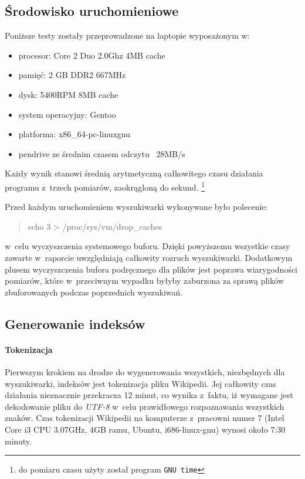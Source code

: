 \documentclass[a4paper,12pt]{article}
\begin{document}
\subsection{Środowisko uruchomieniowe}

Poniższe testy zostały przeprowadzone na laptopie wyposażonym w:
\begin{itemize}
	\item procesor: Core 2 Duo 2.0Ghz 4MB cache
	\item pamięć: 2 GB DDR2 667MHz
	\item dysk: 5400RPM 8MB cache
	\item system operacyjny: Gentoo
	\item platforma: x86\_64-pc-linux\dywiz gnu
	\item pendrive ze średnim czasem odczytu ~28MB/s
\end{itemize}
Każdy wynik stanowi średnią arytmetyczną całkowitego czasu działania programu
z~trzech pomiarów, zaokrągloną do sekund.
\footnote{do pomiaru czasu użyty został program \texttt{GNU time}}

Przed każdym uruchomieniem wyszukiwarki wykonywane było polecenie:
\begin{quote}
	echo 3 \textgreater{} /proc/sys/vm/drop\_caches
\end{quote}
w~celu wyczyszczenia systemowego buforu. Dzięki powyższemu wszystkie czasy zawarte
w~raporcie uwzględniają całkowity rozruch wyszukiwarki. Dodatkowym plusem
wyczyszczenia bufora podręcznego dla plików jest poprawa wiarygodności
pomiarów, które w~przeciwnym wypadku byłyby zaburzona za sprawą plików
zbuforowanych podczas poprzednich wyszukiwań.

\subsection{Generowanie indeksów}

\paragraph{Tokenizacja}
Pierwszym krokiem na drodze do wygenerowania wszystkich, niezbędnych dla
wyszukiwarki, indeksów jest tokenizacja pliku Wikipedii. Jej całkowity czas
działania nieznacznie przekracza 12 minut, co wynika z~faktu, iż wymagane jest
dekodowanie pliku do \textit{UTF-8} w~celu prawidłowego rozpoznawania
wszystkich znaków. Czas tokenizacji Wikipedii na komputerze z~pracowni numer 7
(Intel Core i3 CPU 3.07GHz, 4GB ramu, Ubuntu, i686-linux-gnu) wynosi około 7:30
minuty.
\end{document}
